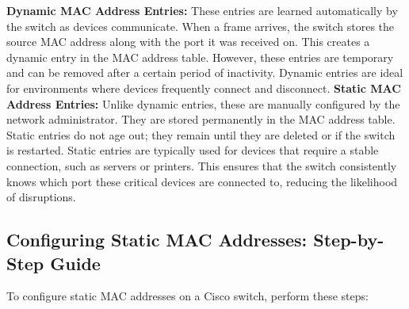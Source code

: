 \documentclass[11pt,a4paper]{article}
\begin{document}
\textbf{Dynamic MAC Address Entries:} These entries are learned automatically by the switch as devices communicate. When a frame arrives, the switch stores the source MAC address along with the port it was received on. This creates a dynamic entry in the MAC address table. However, these entries are temporary and can be removed after a certain period of inactivity. Dynamic entries are ideal for environments where devices frequently connect and disconnect.
\newline
\newline
\textbf{Static MAC Address Entries:} Unlike dynamic entries, these are manually configured by the network administrator. They are stored permanently in the MAC address table. Static entries do not age out; they remain until they are deleted or if the switch is restarted. Static entries are typically used for devices that require a stable connection, such as servers or printers. This ensures that the switch consistently knows which port these critical devices are connected to, reducing the likelihood of disruptions.


\subsection*{Configuring Static MAC Addresses: Step-by-Step Guide}

To configure static MAC addresses on a Cisco switch, perform these steps:
\end{document}
